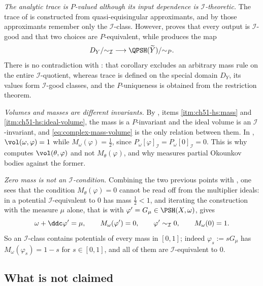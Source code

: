 \emph{The analytic trace is \(P\)-valued although its input dependence is
\(\mathcal I\)-theoretic.}  The trace of
 is constructed from
quasi-equisingular approximants, and by
 those approximants remember only the
\(\mathcal I\)-class.  However,
 proves that every output is
\(\mathcal I\)-good and that two choices are \(P\)-equivalent, while
 produces the map
\[
 D_Y/{\sim_{\mathcal I}}
 \longrightarrow
 \QPSH(\widetilde Y)/{\sim_P}.
\]
There is no contradiction with :
that corollary excludes an arbitrary mass rule on the entire
\(\mathcal I\)-quotient, whereas trace is defined on the special domain
\(D_Y\), its values form \(\mathcal I\)-good classes, and the
\(P\)-uniqueness is obtained from the restriction theorem.

\emph{Volumes and masses are different invariants.}  By
, items \cref{itm:ch51-hs:mass} and
\cref{itm:ch51-hs:ideal-volume}, the mass is a \(P\)-invariant and the
ideal volume is an \(\mathcal I\)-invariant, and
\eqref{eq:complex-mass-volume} is the only relation between them.  In
, \(\vol(\omega,\varphi)=1\) while
\(M_\omega(\varphi)=\tfrac12\), since
\(P_\omega[\varphi]_{\mathcal I}=P_\omega[0]_{\mathcal I}=0\).  This is
why  computes
\(\vol(\theta,\varphi)\) and not \(M_\theta(\varphi)\), and why
 measures partial Okounkov bodies
against the former.

\emph{Zero mass is not an \(\mathcal I\)-condition.}  Combining the two
previous points with , one sees that the
condition \(M_\theta(\varphi)=0\) cannot be read off from the multiplier
ideals: in  a potential \(\mathcal I\)-equivalent to
\(0\) has mass \(\tfrac12<1\), and iterating the construction with the
measure \(\mu\) alone, that is with
\(\varphi'=G_\mu\in\PSH(X,\omega)\), gives
\[
 \omega+\ddc\varphi'=\mu,
 \qquad
 M_\omega(\varphi')=0,
 \qquad
 \varphi'\sim_{\mathcal I}0,
 \qquad
 M_\omega(0)=1 .
\]
So an \(\mathcal I\)-class contains potentials of every mass in
\([0,1]\); indeed \(\varphi_s:=sG_\mu\) has
\(M_\omega(\varphi_s)=1-s\) for \(s\in[0,1]\), and all of them are
\(\mathcal I\)-equivalent to \(0\).

\subsection{What is not claimed}
\label{sec:ch51-not-claimed}

